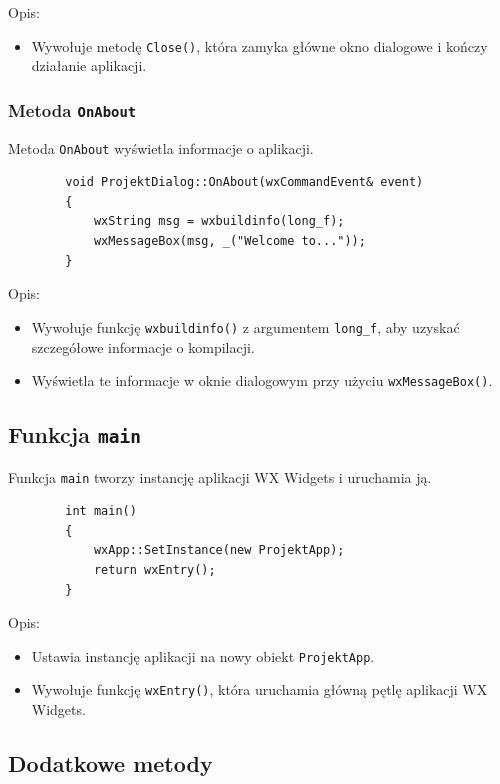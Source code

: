 \documentclass[]{article}
\begin{document}
	Opis:
	\begin{itemize}
		\item Wywołuje metodę \texttt{Close()}, która zamyka główne okno dialogowe i kończy działanie aplikacji.
	\end{itemize}
	
	\subsubsection{Metoda \texttt{OnAbout}}
	
	Metoda \texttt{OnAbout} wyświetla informacje o aplikacji.
	
	\begin{verbatim}
		void ProjektDialog::OnAbout(wxCommandEvent& event)
		{
			wxString msg = wxbuildinfo(long_f);
			wxMessageBox(msg, _("Welcome to..."));
		}
	\end{verbatim}
	
	Opis:
	\begin{itemize}
		\item Wywołuje funkcję \texttt{wxbuildinfo()} z argumentem \texttt{long\_f}, aby uzyskać szczegółowe informacje o kompilacji.
		\item Wyświetla te informacje w oknie dialogowym przy użyciu \texttt{wxMessageBox()}.
	\end{itemize}
	
	\subsection{Funkcja \texttt{main}}
	
	Funkcja \texttt{main} tworzy instancję aplikacji WX Widgets i uruchamia ją.
	
	\begin{verbatim}
		int main()
		{
			wxApp::SetInstance(new ProjektApp);
			return wxEntry();
		}
	\end{verbatim}
	
	Opis:
	\begin{itemize}
		\item Ustawia instancję aplikacji na nowy obiekt \texttt{ProjektApp}.
		\item Wywołuje funkcję \texttt{wxEntry()}, która uruchamia główną pętlę aplikacji WX Widgets.
	\end{itemize}
	
	\subsection{Dodatkowe metody}
	
\end{document}
